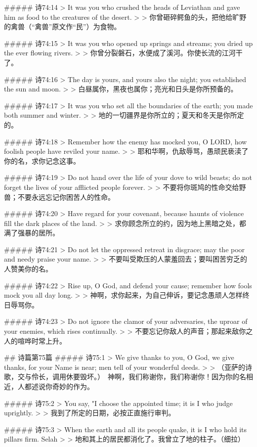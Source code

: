 ##### 诗74:14
> It was you who crushed the heads of Leviathan and gave him as food to the creatures of the desert.
>
> 你曾砸碎鳄鱼的头，把他给旷野的禽兽（“禽兽”原文作“民”）为食物。


##### 诗74:15
> It was you who opened up springs and streams; you dried up the ever flowing rivers.
>
> 你曾分裂磐石，水便成了溪河。你使长流的江河干了。


##### 诗74:16
> The day is yours, and yours also the night; you established the sun and moon.
>
> 白昼属你，黑夜也属你；亮光和日头是你所预备的。


##### 诗74:17
> It was you who set all the boundaries of the earth; you made both summer and winter.
>
> 地的一切疆界是你所立的；夏天和冬天是你所定的。


##### 诗74:18
> Remember how the enemy has mocked you, O LORD, how foolish people have reviled your name.
>
> 耶和华啊，仇敌辱骂，愚顽民亵渎了你的名，求你记念这事。


##### 诗74:19
> Do not hand over the life of your dove to wild beasts; do not forget the lives of your afflicted people forever.
>
> 不要将你斑鸠的性命交给野兽；不要永远忘记你困苦人的性命。


##### 诗74:20
> Have regard for your covenant, because haunts of violence fill the dark places of the land.
>
> 求你顾念所立的约，因为地上黑暗之处，都满了强暴的居所。


##### 诗74:21
> Do not let the oppressed retreat in disgrace; may the poor and needy praise your name.
>
> 不要叫受欺压的人蒙羞回去；要叫困苦穷乏的人赞美你的名。


##### 诗74:22
> Rise up, O God, and defend your cause; remember how fools mock you all day long.
>
> 神啊，求你起来，为自己伸诉，要记念愚顽人怎样终日辱骂你。


##### 诗74:23
> Do not ignore the clamor of your adversaries, the uproar of your enemies, which rises continually.
>
> 不要忘记你敌人的声音；那起来敌你之人的喧哗时常上升。


## 诗篇第75篇
##### 诗75:1
> We give thanks to you, O God, we give thanks, for your Name is near; men tell of your wonderful deeds.
>
> （亚萨的诗歌，交与伶长，调用休要毁坏。）　神啊，我们称谢你，我们称谢你！因为你的名相近，人都述说你奇妙的作为。


##### 诗75:2
> You say, "I choose the appointed time; it is I who judge uprightly.
>
> 我到了所定的日期，必按正直施行审判。


##### 诗75:3
> When the earth and all its people quake, it is I who hold its pillars firm. Selah
>
> 地和其上的居民都消化了。我曾立了地的柱子。（细拉）


